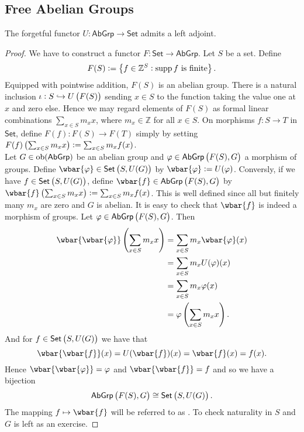 \subsection*{Free Abelian Groups}

\begin{proposition}
	\label{prop:F_set_abgrp}
	The forgetful functor $U : \mathsf{AbGrp} \to \mathsf{Set}$ admits a left adjoint.	
\end{proposition}

\begin{proof}
	We have to construct a functor $F : \mathsf{Set} \to \mathsf{AbGrp}$. Let $S$ be a set. Define 
	\begin{equation*}
		F(S) := \cbr[1]{f \in \mathbb{Z}^S : \supp f \text{ is finite}}.
	\end{equation*}
	Equipped with pointwise addition, $F(S)$ is an abelian group. There is a natural inclusion $\iota : S \hookrightarrow U\del[1]{F(S)}$ sending $x \in S$ to the function taking the value one at $x$ and zero else. Hence we may regard elements of $F(S)$ as formal linear combinations $\sum_{x \in S}m_x x$, where $m_x \in \mathbb{Z}$ for all $x \in S$. On morphisms $f : S \to T$ in $\mathsf{Set}$, define $F(f) : F(S) \to F(T)$ simply by setting $F(f)\del[1]{\sum_{x \in S}m_x x} := \sum_{x \in S}m_x f(x)$.\\	
	Let $G \in \operatorname{ob}(\mathsf{AbGrp})$ be an abelian group and $\varphi \in \mathsf{AbGrp}\del[1]{F(S), G}$ a morphism of groups. Define $\wbar{\varphi} \in \mathsf{Set}\del[1]{S,U(G)}$ by $\wbar{\varphi} := U(\varphi)$. Conversly, if we have $f \in \mathsf{Set}\del[1]{S,U(G)}$, define $\wbar{f} \in \mathsf{AbGrp}\del[1]{F(S),G}$ by $\wbar{f}\del[1]{\sum_{x \in S} m_x x} := \sum_{x \in S} m_x f(x)$. This is well defined since all but finitely many $m_x$ are zero and $G$ is abelian. It is easy to check that $\wbar{f}$ is indeed a morphism of groups. Let $\varphi \in \mathsf{AbGrp}\del[1]{F(S),G}$. Then
	\begin{align*}
		\wbar{\wbar{\varphi}}\del[4]{\sum_{x \in S} m_x x} &= \sum_{x \in S}m_x \wbar{\varphi}(x)\\
		&= \sum_{x \in S} m_x U(\varphi)(x)\\
		&= \sum_{x \in S} m_x \varphi(x)\\
		&= \varphi \del[4]{\sum_{x \in S} m_x x}.
	\end{align*}
	And for $f \in \mathsf{Set}\del[1]{S,U(G)}$ we have that
	\begin{equation*}
		\wbar{\wbar{f}}(x) = U(\wbar{f})(x) = \wbar{f}(x) = f(x). 
	\end{equation*}
	\noindent Hence $\wbar{\wbar{\varphi}} = \varphi$ and $\wbar{\wbar{f}} = f$ and so we have a bijection
	\begin{equation*}
		\mathsf{AbGrp}\del[1]{F(S),G} \cong \mathsf{Set}\del[1]{S,U(G)}.
	\end{equation*}
	The mapping $f \mapsto \wbar{f}$ will be referred to as . To check naturality in $S$ and $G$ is left as an exercise.
\end{proof}

